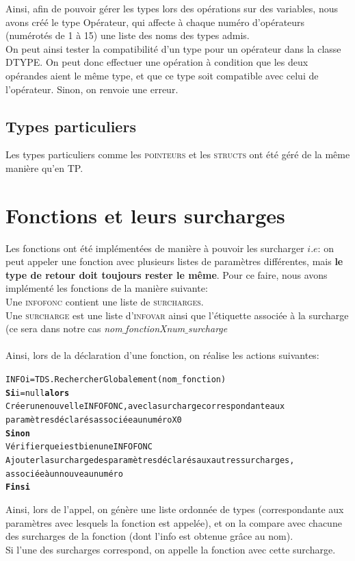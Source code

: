 \documentclass[11pt,a4paper]{report}
\begin{document}
Ainsi, afin de pouvoir gérer les types lors des opérations sur des variables, nous avons créé le type Opérateur, qui affecte à chaque numéro d'opérateurs (numérotés de 1 à 15) une liste des noms des types admis.\\
 On peut ainsi tester la compatibilité d'un type pour un opérateur dans la classe DTYPE. On peut donc effectuer une opération à condition que les deux opérandes aient le même type, et que ce type soit compatible avec celui de l'opérateur. Sinon, on renvoie une erreur.



\subsection{Types particuliers}

 Les types particuliers comme les \textsc{pointeurs} et les \textsc{structs} ont été géré de la même manière qu'en TP.

\section{Fonctions et leurs surcharges}

Les fonctions ont été implémentées de manière à pouvoir les surcharger $i.e$: on peut appeler une fonction avec plusieurs listes de paramètres différentes, mais {\bf le type de retour doit toujours rester le même}. Pour ce faire, nous avons implémenté les fonctions de la manière suivante: \\
Une \textsc{infofonc} contient une liste de \textsc{surcharges}. \\
Une \textsc{surcharge} est une liste d'\textsc{infovar} ainsi que l'étiquette associée à la surcharge (ce sera dans notre cas \textsl{nom$\_$fonctionXnum$\_$surcharge}  \\\\
Ainsi, lors de la déclaration d'une fonction, on réalise les actions suivantes: 
\begin{alltt}
INFO i = TDS.RechercherGlobalement(nom_fonction)
  {\bf Si} i = null {\bf alors}
      Créer une nouvelle INFOFONC, avec la surcharge correspondante aux 
      paramètres déclarés associée au numéro X0
  {\bf Sinon}
      Vérifier que i est bien une INFOFONC
      Ajouter la surcharge des paramètres déclarés aux autres surcharges,
      associée à un nouveau numéro
  {\bf Fin si} 
\end{alltt}

Ainsi, lors de l'appel, on génère une liste ordonnée de types (correspondante aux paramètres avec lesquels la fonction est appelée), et on la compare avec chacune des surcharges de la fonction (dont l'info est obtenue grâce au nom). \\ 
Si l'une des surcharges correspond, on appelle la fonction avec cette surcharge.
\end{document}
